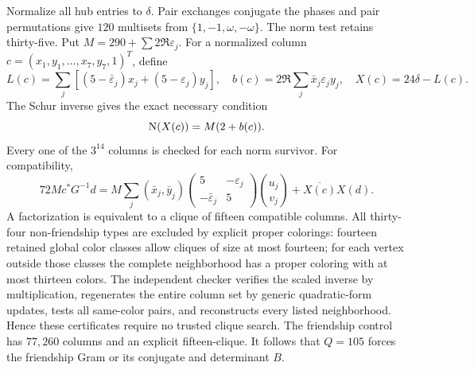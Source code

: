 Normalize all hub entries to $\delta$. Pair exchanges conjugate the phases and pair permutations give $120$ multisets from $\{1,-1,\omega,-\omega\}$. The norm test retains thirty-five. Put $M=290+\sum2\Re\varepsilon_j$. For a normalized column $c=(x_1,y_1,\ldots,x_7,y_7,1)^T$, define
\[L(c)=\sum_j[(5-\bar\varepsilon_j)x_j+(5-\varepsilon_j)y_j],\quad
 b(c)=2\Re\sum_j\bar x_j\varepsilon_j y_j,\quad X(c)=24\delta-L(c).\]
The Schur inverse gives the exact necessary condition
\[\operatorname N(X(c))=M(2+b(c)).\]
Every one of the $3^{14}$ columns is checked for each norm survivor. For compatibility,
\[72M c^*G^{-1}d=M\sum_j(\bar x_j,\bar y_j)
 \begin{pmatrix}5&-\varepsilon_j\\-\bar\varepsilon_j&5\end{pmatrix}
 \binom{u_j}{v_j}+\overline{X(c)}X(d).\]
A factorization is equivalent to a clique of fifteen compatible columns. All thirty-four non-friendship types are excluded by explicit proper colorings: fourteen retained global color classes allow cliques of size at most fourteen; for each vertex outside those classes the complete neighborhood has a proper coloring with at most thirteen colors. The independent checker verifies the scaled inverse by multiplication, regenerates the entire column set by generic quadratic-form updates, tests all same-color pairs, and reconstructs every listed neighborhood. Hence these certificates require no trusted clique search. The friendship control has $77{,}260$ columns and an explicit fifteen-clique. It follows that $Q=105$ forces the friendship Gram or its conjugate and determinant $B$.

